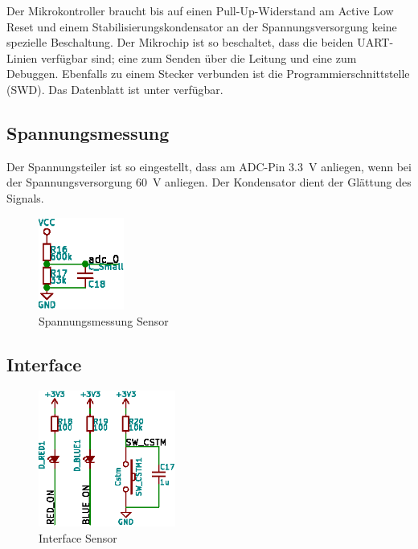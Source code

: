 Der  Mikrokontroller  braucht  bis  auf  einen  Pull-Up-Widerstand  am  Active
Low  Reset und  einem  Stabilisierungskondensator  an der  Spannungsversorgung
keine  spezielle  Beschaltung. Der  Mikrochip  ist  so  beschaltet,  dass  die
beiden  UART-Linien  verf\"ugbar sind;  eine  zum  Senden \"uber  die  Leitung
und  eine  zum   Debuggen. Ebenfalls  zu  einem  Stecker   verbunden  ist  die
Programmierschnittstelle (SWD). Das Datenblatt  ist unter \cite{ref:atmel:cpu}
verf\"ugbar.



\clearpage
\subsection{Spannungsmessung}
\label{subsec:hw:sensor:voltageSense}

Der  Spannungsteiler  ist  so  eingestellt, dass  am  ADC-Pin  \SI{3.3}{\volt}
anliegen,  wenn  bei  der Spannungsversorgung  \SI{60}{\volt}  anliegen.   Der
Kondensator  dient der Gl\"attung des Signals.

\begin{figure}[h!t]
    \centering
    \includegraphics[width=0.25\textwidth]{images/sensor-sch/sensor--sch--sensor.eps}
    \caption[Sensor: Schema Spannungsmessung]{Spannungsmessung Sensor}
\end{figure}


\subsection{Interface}
\label{subsec:hw:sensor:interface}

\begin{figure}[h!t]
    \centering
    \includegraphics[angle=-90,width=0.4\textwidth]{images/sensor-sch/sensor--sch--interface.eps}
    \caption[Sensor: Schema Interface]{Interface Sensor}
\end{figure}

